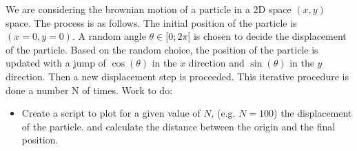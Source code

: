 \bexo


We are considering the brownian motion of a particle in a 2D space $(x,y)$ space. The process is as follows. The initial position of the particle is $(x=0,y=0)$. A random angle $\theta\in [0;2\pi[$ is chosen to decide the displacement of the particle. Based on the random choice, the position of the particle is updated with a jump of $\cos(\theta)$ in the $x$ direction and $\sin(\theta)$ in the $y$ direction. Then a new displacement step is proceeded. This iterative procedure is done a number N of times. 
Work to do:

\begin{itemize}
	\item Create a script to plot for a given value of $N$, (e.g. $N=100$) the displacement of the particle. and calculate the distance between the origin and the final position.
\end{itemize}



\eexo
\solution{
}
